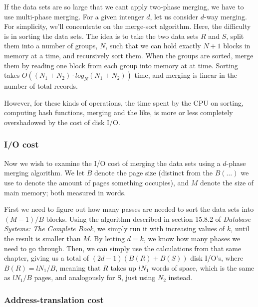 \documentclass[a4paper, 12pt]{article}
\begin{document}
If the data sets are so large that we cant apply two-phase merging, we
have to use multi-phase merging. For a given intenger $d$, let us
consider $d$-way merging. For simplicity, we'll concentrate on the
merge-sort algorithm. Here, the difficulty is in sorting the data
sets. The idea is to take the two data sets $R$ and $S$, split them
into a number of groups, $N$, such that we can hold exactly $N+1$
blocks in memory at a time, and recursively sort them. When the groups
are sorted, merge them by reading one block from each group into
memory at at time. Sorting takes $O((N_1 + N_2) \cdot log_N(N_1 +
N_2))$ time, and merging is linear in the number of total records.

However, for these kinds of operations, the time spent by the CPU on
sorting, computing hash functions, merging and the like, is more or
less completely overshadowed by the cost of disk I/O.

\subsubsection*{I/O cost}


Now we wish to examine the I/O cost of merging the data sets using a
$d$-phase merging algorithm. We let $B$ denote the page size (distinct
from the $B(\ldots)$ we use to denote the amount of pages something
occupies), and $M$ denote the size of main memory; both measured in
words.

First we need to figure out how many passes are needed to sort the
data sets into $(M-1)/B$ blocks. Using the algorithm described in
section 15.8.2 of \emph{Database Systems: The Complete Book}, we
simply run it with increasing values of $k$, until the result is
smaller than $M$. By letting $d = k$, we know how many phases we need
to go through. Then, we can simply use the calculations from that same
chapter, giving us a total of $(2d-1)(B(R) + B(S))$ disk I/O's, where
$B(R) = lN_1 / B$, meaning that $R$ takes up $lN_1$ words of space,
which is the same as $lN_1 / B$ pages, and analogously for S, just
using $N_2$ instead.

\subsubsection*{Address-translation cost}
\end{document}
